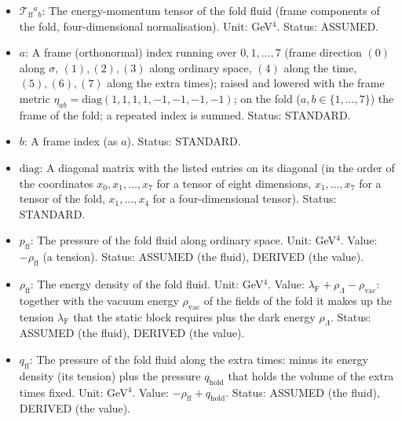 \documentclass[
  10pt,
]{article}
\providecommand{\tightlist}{%
  \setlength{\itemsep}{0pt}\setlength{\parskip}{0pt}}
\begin{document}
\begin{itemize}
\tightlist
\item
  \(\mathcal{T}_{\mathrm{ff}}{}^a{}_b\): The energy-momentum tensor of
  the fold fluid (frame components of the fold, four-dimensional
  normalisation). Unit: GeV\(^4\). Status: ASSUMED.
\item
  \(a\): A frame (orthonormal) index running over \(0, 1, \dots, 7\)
  (frame direction \((0)\) along \(\sigma\), \((1), (2), (3)\) along
  ordinary space, \((4)\) along the time, \((5), (6), (7)\) along the
  extra times); raised and lowered with the frame metric
  \(\eta_{ab} = \mathrm{diag}(1, 1, 1, 1, -1, -1, -1, -1)\); on the fold
  (\(a, b \in \{1, \dots, 7\}\)) the frame of the fold; a repeated index
  is summed. Status: STANDARD.
\item
  \(b\): A frame index (as \(a\)). Status: STANDARD.
\item
  \(\mathrm{diag}\): A diagonal matrix with the listed entries on its
  diagonal (in the order of the coordinates \(x_0, x_1, \dots, x_7\) for
  a tensor of eight dimensions, \(x_1, \dots, x_7\) for a tensor of the
  fold, \(x_1, \dots, x_4\) for a four-dimensional tensor). Status:
  STANDARD.
\item
  \(p_{\mathrm{ff}}\): The pressure of the fold fluid along ordinary
  space. Unit: GeV\(^4\). Value: \(-\rho_{\mathrm{ff}}\) (a tension).
  Status: ASSUMED (the fluid), DERIVED (the value).
\item
  \(\rho_{\mathrm{ff}}\): The energy density of the fold fluid. Unit:
  GeV\(^4\). Value:
  \(\lambda_{\mathrm{F}} + \rho_\Lambda - \rho_{\mathrm{vac}}\):
  together with the vacuum energy \(\rho_{\mathrm{vac}}\) of the fields
  of the fold it makes up the tension \(\lambda_{\mathrm{F}}\) that the
  static block requires plus the dark energy \(\rho_\Lambda\). Status:
  ASSUMED (the fluid), DERIVED (the value).
\item
  \(q_{\mathrm{ff}}\): The pressure of the fold fluid along the extra
  times: minus its energy density (its tension) plus the pressure
  \(q_{\mathrm{hold}}\) that holds the volume of the extra times fixed.
  Unit: GeV\(^4\). Value: \(-\rho_{\mathrm{ff}} + q_{\mathrm{hold}}\).
  Status: ASSUMED (the fluid), DERIVED (the value).
\end{itemize}
\end{document}
